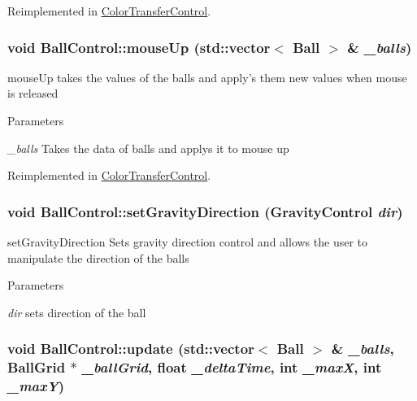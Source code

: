 Reimplemented in \hyperlink{classColorTransferControl_a84567646b6a7d814aa8de8660da69543}{ColorTransferControl}.\hypertarget{classBallControl_adbc3a6859b147973570a0a531942e595}{
\subsubsection[{mouseUp}]{\setlength{\rightskip}{0pt plus 5cm}void BallControl::mouseUp (std::vector$<$ {\bf Ball} $>$ \& {\em \_\-balls})}}
\label{classBallControl_adbc3a6859b147973570a0a531942e595}


mouseUp takes the values of the balls and apply's them new values when mouse is released 
\begin{DoxyParams}{Parameters}
\item[{\em \_\-balls}]Takes the data of balls and applys it to mouse up \end{DoxyParams}


Reimplemented in \hyperlink{classColorTransferControl_a335ef9511d0cacec325a154c106bb1da}{ColorTransferControl}.\hypertarget{classBallControl_afa0b3f2735a09bd485ff70ce76ba0ec4}{
\subsubsection[{setGravityDirection}]{\setlength{\rightskip}{0pt plus 5cm}void BallControl::setGravityDirection (GravityControl {\em dir})}}
\label{classBallControl_afa0b3f2735a09bd485ff70ce76ba0ec4}


setGravityDirection Sets gravity direction control and allows the user to manipulate the direction of the balls 
\begin{DoxyParams}{Parameters}
\item[{\em dir}]sets direction of the ball \end{DoxyParams}
\hypertarget{classBallControl_af32a9b232b26af69231966ae3aab98d5}{
\subsubsection[{update}]{\setlength{\rightskip}{0pt plus 5cm}void BallControl::update (std::vector$<$ {\bf Ball} $>$ \& {\em \_\-balls}, \/  {\bf BallGrid} $\ast$ {\em \_\-ballGrid}, \/  float {\em \_\-deltaTime}, \/  int {\em \_\-maxX}, \/  int {\em \_\-maxY})}}
\label{classBallControl_af32a9b232b26af69231966ae3aab98d5}


